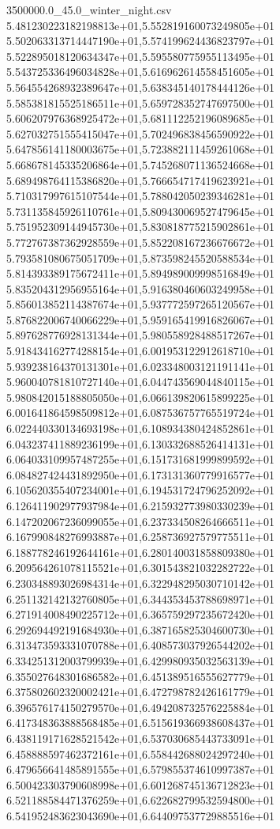 \begin{filecontents*}{3500000.0_45.0_winter_night.csv}
5.481230223182198813e+01,5.552819160073249805e+01
5.502063313714447190e+01,5.574199624436823797e+01
5.522895018120634347e+01,5.595580775955113495e+01
5.543725336496034828e+01,5.616962614558451605e+01
5.564554268932389647e+01,5.638345140178444126e+01
5.585381815525186511e+01,5.659728352747697500e+01
5.606207976368925472e+01,5.681112252196089685e+01
5.627032751555415047e+01,5.702496838456590922e+01
5.647856141180003675e+01,5.723882111459261068e+01
5.668678145335206864e+01,5.745268071136524668e+01
5.689498764115386820e+01,5.766654717419623921e+01
5.710317997615107544e+01,5.788042050239346281e+01
5.731135845926110761e+01,5.809430069527479645e+01
5.751952309144945730e+01,5.830818775215902861e+01
5.772767387362928559e+01,5.852208167236676672e+01
5.793581080675051709e+01,5.873598245520588534e+01
5.814393389175672411e+01,5.894989009998516849e+01
5.835204312956955164e+01,5.916380460603249958e+01
5.856013852114387674e+01,5.937772597265120567e+01
5.876822006740066229e+01,5.959165419916826067e+01
5.897628776928131344e+01,5.980558928488517267e+01
5.918434162774288154e+01,6.001953122912618710e+01
5.939238164370131301e+01,6.023348003121191141e+01
5.960040781810727140e+01,6.044743569044840115e+01
5.980842015188805050e+01,6.066139820615899225e+01
6.001641864598509812e+01,6.087536757765519724e+01
6.022440330134693198e+01,6.108934380424852861e+01
6.043237411889236199e+01,6.130332688526414131e+01
6.064033109957487255e+01,6.151731681999899592e+01
6.084827424431892950e+01,6.173131360779916577e+01
6.105620355407234001e+01,6.194531724796252092e+01
6.126411902977937984e+01,6.215932773980330239e+01
6.147202067236099055e+01,6.237334508264666511e+01
6.167990848276993887e+01,6.258736927579775511e+01
6.188778246192644161e+01,6.280140031858809380e+01
6.209564261078115521e+01,6.301543821032282722e+01
6.230348893026984314e+01,6.322948295030710142e+01
6.251132142132760805e+01,6.344353453788698971e+01
6.271914008490225712e+01,6.365759297235672420e+01
6.292694492191684930e+01,6.387165825304600730e+01
6.313473593331070788e+01,6.408573037926544202e+01
6.334251312003799939e+01,6.429980935032563139e+01
6.355027648301686582e+01,6.451389516555627779e+01
6.375802602320002421e+01,6.472798782426161779e+01
6.396576174150279570e+01,6.494208732576225884e+01
6.417348363888568485e+01,6.515619366938608437e+01
6.438119171628521542e+01,6.537030685443733091e+01
6.458888597462372161e+01,6.558442688024297240e+01
6.479656641485891555e+01,6.579855374610997387e+01
6.500423303790608998e+01,6.601268745136712823e+01
6.521188584471376259e+01,6.622682799532594800e+01
6.541952483623043690e+01,6.644097537729885516e+01

\end{filecontents*}
